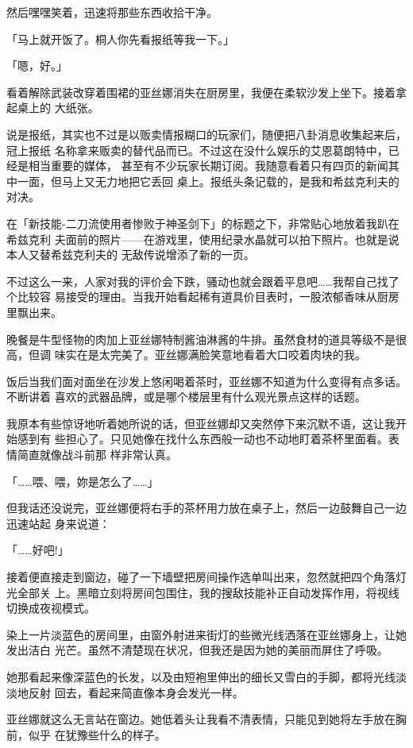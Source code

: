 \documentclass[11pt]{book}
\begin{document}
然后嘿嘿笑着，迅速将那些东西收拾干净。

「马上就开饭了。桐人你先看报纸等我一下。」

「嗯，好。」

看着解除武装改穿着围裙的亚丝娜消失在厨房里，我便在柔软沙发上坐下。接着拿起桌上的
大纸张。

说是报纸，其实也不过是以贩卖情报糊口的玩家们，随便把八卦消息收集起来后，冠上报纸
名称拿来贩卖的替代品而已。不过这在没什么娱乐的艾恩葛朗特中，已经是相当重要的媒体，
甚至有不少玩家长期订阅。我随意看着只有四页的新闻其中一面，但马上又无力地把它丢回
桌上。报纸头条记载的，是我和希兹克利夫的对决。

在「新技能-二刀流使用者惨败于神圣剑下」的标题之下，非常贴心地放着我趴在希兹克利
夫面前的照片——在游戏里，使用纪录水晶就可以拍下照片。也就是说本人又替希兹克利夫的
无敌传说增添了新的一页。

不过这么一来，人家对我的评价会下跌，骚动也就会跟着平息吧……我帮自己找了个比较容
易接受的理由。当我开始看起稀有道具价目表时，一股浓郁香味从厨房里飘出来。

晚餐是牛型怪物的肉加上亚丝娜特制酱油淋酱的牛排。虽然食材的道具等级不是很高，但调
味实在是太完美了。亚丝娜满脸笑意地看着大口咬着肉块的我。

饭后当我们面对面坐在沙发上悠闲喝着茶时，亚丝娜不知道为什么变得有点多话。不断讲着
喜欢的武器品牌，或是哪个楼层里有什么观光景点这样的话题。

我原本有些惊讶地听着她所说的话，但亚丝娜却又突然停下来沉默不语，这让我开始感到有
些担心了。只见她像在找什么东西般一动也不动地盯着茶杯里面看。表情简直就像战斗前那
样非常认真。

「……喂、喂，妳是怎么了……」

但我话还没说完，亚丝娜便将右手的茶杯用力放在桌子上，然后一边鼓舞自己一边迅速站起
身来说道：

「……好吧!」

接着便直接走到窗边，碰了一下墙壁把房间操作选单叫出来，忽然就把四个角落灯光全部关
上。黑暗立刻将房间包围住，我的搜敌技能补正自动发挥作用，将视线切换成夜视模式。

染上一片淡蓝色的房间里，由窗外射进来街灯的些微光线洒落在亚丝娜身上，让她发出洁白
光芒。虽然不清楚现在状况，但我还是因为她的美丽而屏住了呼吸。

她那看起来像深蓝色的长发，以及由短袍里伸出的细长又雪白的手脚，都将光线淡淡地反射
回去，看起来简直像本身会发光一样。

亚丝娜就这么无言站在窗边。她低着头让我看不清表情，只能见到她将左手放在胸前，似乎
在犹豫些什么的样子。
\end{document}
